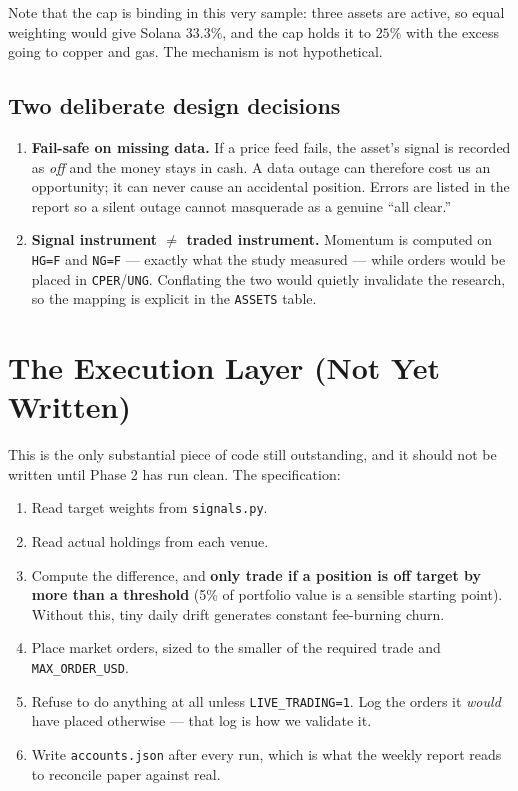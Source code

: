 \documentclass[11pt,a4paper]{article}
\begin{document}
Note that the cap is binding in this very sample: three assets are
active, so equal weighting would give Solana $33.3\%$, and the cap
holds it to $25\%$ with the excess going to copper and gas. The
mechanism is not hypothetical.

\subsection{Two deliberate design decisions}

\begin{enumerate}[leftmargin=2em]
    \item \textbf{Fail-safe on missing data.} If a price feed fails, the
          asset's signal is recorded as \emph{off} and the money stays
          in cash. A data outage can therefore cost us an opportunity;
          it can never cause an accidental position. Errors are listed
          in the report so a silent outage cannot masquerade as a
          genuine ``all clear.''
    \item \textbf{Signal instrument $\neq$ traded instrument.} Momentum
          is computed on \texttt{HG=F} and \texttt{NG=F} --- exactly what
          the study measured --- while orders would be placed in
          \texttt{CPER}/\texttt{UNG}. Conflating the two would quietly
          invalidate the research, so the mapping is explicit in the
          \texttt{ASSETS} table.
\end{enumerate}

\section{The Execution Layer (Not Yet Written)}
\label{sec:exec}

This is the only substantial piece of code still outstanding, and it
should not be written until Phase 2 has run clean. The specification:

\begin{enumerate}[leftmargin=2em]
    \item Read target weights from \texttt{signals.py}.
    \item Read actual holdings from each venue.
    \item Compute the difference, and \textbf{only trade if a position
          is off target by more than a threshold} (5\% of portfolio
          value is a sensible starting point). Without this, tiny daily
          drift generates constant fee-burning churn.
    \item Place market orders, sized to the smaller of the required
          trade and \texttt{MAX\_ORDER\_USD}.
    \item Refuse to do anything at all unless
          \texttt{LIVE\_TRADING=1}. Log the orders it \emph{would} have
          placed otherwise --- that log is how we validate it.
    \item Write \texttt{accounts.json} after every run, which is what
          the weekly report reads to reconcile paper against real.
\end{enumerate}
\end{document}
